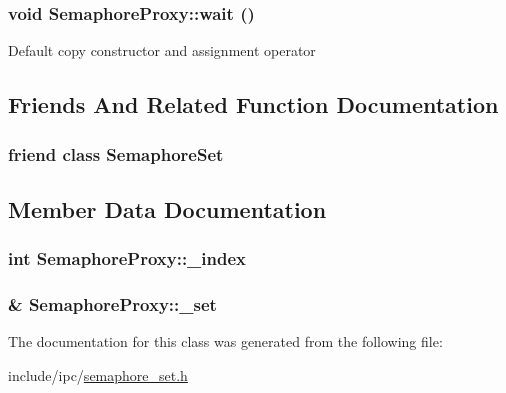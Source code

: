 \hypertarget{classSemaphoreProxy_7a98f97acc2ebd867f4f0026be765f1a}{
\subsubsection[{wait}]{\setlength{\rightskip}{0pt plus 5cm}void SemaphoreProxy::wait ()}}
\label{classSemaphoreProxy_7a98f97acc2ebd867f4f0026be765f1a}


Default copy constructor and assignment operator 

\subsection{Friends And Related Function Documentation}
\hypertarget{classSemaphoreProxy_cda15c201fe6c8eb854baebf4fa62df6}{
\subsubsection[{SemaphoreSet}]{\setlength{\rightskip}{0pt plus 5cm}friend class {\bf SemaphoreSet}}}
\label{classSemaphoreProxy_cda15c201fe6c8eb854baebf4fa62df6}




\subsection{Member Data Documentation}
\hypertarget{classSemaphoreProxy_bc60613f713d387d753d036c92a392c6}{
\subsubsection[{\_\-index}]{\setlength{\rightskip}{0pt plus 5cm}int {\bf SemaphoreProxy::\_\-index}}}
\label{classSemaphoreProxy_bc60613f713d387d753d036c92a392c6}


\hypertarget{classSemaphoreProxy_5beeb50683a0de74f3f76c4891181f69}{
\subsubsection[{\_\-set}]{\& {\bf SemaphoreProxy::\_\-set}}}
\label{classSemaphoreProxy_5beeb50683a0de74f3f76c4891181f69}




The documentation for this class was generated from the following file:\begin{CompactItemize}
\item 
include/ipc/\hyperlink{semaphore__set_8h}{semaphore\_\-set.h}\end{CompactItemize}
